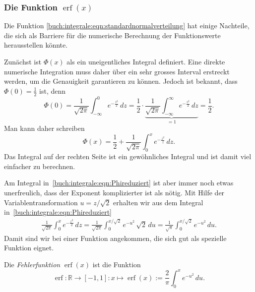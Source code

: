 %
%
\subsubsection{Die Funktion $\operatorname{erf}(x)$}
Die Funktion \eqref{buch:integrale:eqn:standardnormalverteilung} hat
einige Nachteile, die sich als Barriere für die numerische 
Berechnung der Funktionswerte herausstellen könnte.

Zunächst ist $\Phi(x)$ als ein uneigentliches Integral definiert.
Eine direkte numerische Integration muss daher über ein sehr grosses
Interval erstreckt werden, um die Genauigkeit garantieren zu können.
Jedoch ist bekannt, dass $\Phi(0)=\frac12$ ist, denn
\[
\Phi(0)
=
\frac{1}{\sqrt{2\pi}}
\int_{-\infty}^0 e^{-\frac{z^2}2}\,dz
=
\frac12\cdot\underbrace{\frac{1}{\sqrt{2\pi}}
\int_{-\infty}^{\infty} e^{-\frac{z^2}2}\,dz}_{\displaystyle=1}
=
\frac12.
\]
Man kann daher schreiben
\begin{equation}
\Phi(x) = \frac12 + \frac{1}{\sqrt{2\pi}}\int_0^x e^{-\frac{z^2}{z}}\,dz.
\label{buch:integrale:eqn:Phireduziert}
\end{equation}
Das Integral auf der rechten Seite ist ein gewöhnliches Integral und ist
damit viel einfacher zu berechnen.

Am Integral in~\eqref{buch:integrale:eqn:Phireduziert} ist aber immer
noch etwas unerfreulich, dass der Exponent komplizierter ist als nötig.
Mit Hilfe der Variablentransformation $u = z/\sqrt{2}$ erhalten wir
aus dem Integral in~\eqref{buch:integrale:eqn:Phireduziert}
\begin{align*}
\frac{1}{\sqrt{2\pi}}
\int_0^x e^{-\frac{z^2}2}\,dz
=
\frac{1}{\sqrt{2\pi}}
\int_0^{x/\sqrt{2}}
e^{-u^2} \, \sqrt{2}\,du
=
\frac{1}{\sqrt{\pi}}
\int_0^{x/\sqrt{2}}
e^{-u^2} \,du.
\end{align*}
Damit sind wir bei einer Funktion angekommen, die sich gut als spezielle
Funktion eignet.

\begin{definition}
Die {\em Fehlerfunktion} $\operatorname{erf}(x)$ ist die Funktion
%
%
\[
\operatorname{erf}
\colon
\mathbb{R}\to [-1,1]
:
x
\mapsto
\operatorname{erf}(x)
:=
\frac{2}{\pi}
\int_0^x e^{-u^2}\,du.
\]
\end{definition}

